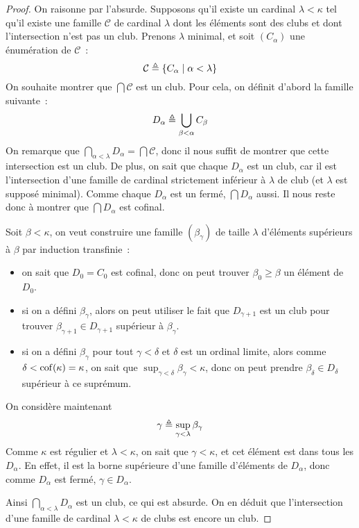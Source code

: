 \begin{proof}
  On raisonne par l'absurde. Supposons qu'il existe un cardinal
  $\lambda < \kappa$ tel qu'il existe une famille $\mathcal C$ de cardinal
  $\lambda$ dont les éléments sont des clubs et dont l'intersection n'est pas
  un club. Prenons $\lambda$ minimal, et soit $(C_\alpha)$ une énumération de
  $\mathcal C$~:
  \[\mathcal C \triangleq \{C_\alpha \mid \alpha < \lambda\}\]
  On souhaite montrer que $\bigcap \mathcal C$ est un club. Pour cela, on
  définit d'abord la famille suivante~:
  \[D_\alpha \triangleq \bigcup_{\beta < \alpha} C_\beta\]
  On remarque que
  $\displaystyle\bigcap_{\alpha < \lambda} D_\alpha = \bigcap\mathcal C$, donc il
  nous suffit de montrer que cette intersection est un club. De plus, on sait
  que chaque $D_\alpha$ est un club, car il est l'intersection
  d'une famille de cardinal strictement inférieur à $\lambda$ de club (et
  $\lambda$ est supposé minimal). Comme chaque $D_\alpha$ est un fermé,
  $\bigcap D_\alpha$ aussi. Il nous reste donc à montrer que $\bigcap D_\alpha$
  est cofinal.

  Soit $\beta < \kappa$, on veut construire une famille $(\beta_\gamma)$ de
  taille $\lambda$ d'éléments supérieurs à $\beta$ par induction transfinie~:
  \begin{itemize}
  \item on sait que $D_0 = C_0$ est cofinal, donc on peut trouver
    $\beta_0 \geq \beta$ un élément de $D_0$.
  \item si on a défini $\beta_\gamma$, alors on peut utiliser le fait que
    $D_{\gamma + 1}$ est un club pour trouver
    $\beta_{\gamma + 1}\in D_{\gamma+ 1}$ supérieur à $\beta_\gamma$.
  \item si on a défini $\beta_\gamma$ pour tout $\gamma < \delta$ et $\delta$
    est un ordinal limite, alors comme $\delta < \operatorname{cof}(\kappa) = \kappa$, on
    sait que $\sup_{\gamma < \delta} \beta_\gamma < \kappa$, donc on peut prendre
    $\beta_\delta \in D_\delta$ supérieur à ce suprémum.
  \end{itemize}
  On considère maintenant
  \[\gamma \triangleq \sup_{\gamma < \lambda} \beta_\gamma\]
  Comme $\kappa$ est régulier et $\lambda < \kappa$, on sait que
  $\gamma < \kappa$, et cet élément est dans tous les $D_\alpha$. En effet, il
  est la borne supérieure d'une famille d'éléments de $D_\alpha$, donc comme
  $D_\alpha$ est fermé, $\gamma \in D_\alpha$.

  Ainsi $\displaystyle\bigcap_{\alpha < \lambda} D_\alpha$ est un club, ce qui est
  absurde. On en déduit que l'intersection d'une famille de cardinal
  $\lambda < \kappa$ de clubs est encore un club.
\end{proof}

